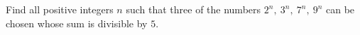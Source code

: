 Find all positive integers $n$ such that three of the numbers $2^n,\ 3^n,\ 7^n,\ 9^n$ can be chosen whose sum is divisible by $5$.
